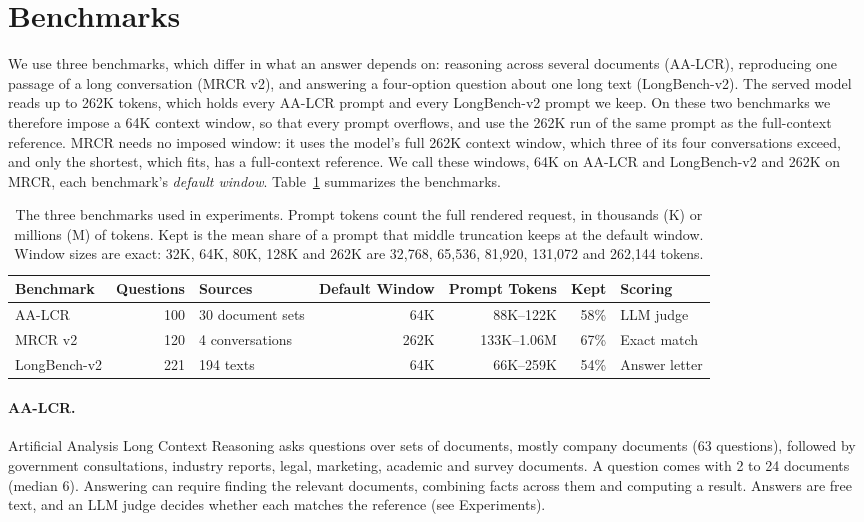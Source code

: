 \documentclass[letterpaper]{article} %
\begin{document}
\section{Benchmarks}
We use three benchmarks, which differ in what an answer depends on: reasoning across several documents (AA-LCR), reproducing one passage of a long conversation (MRCR v2), and answering a four-option question about one long text (LongBench-v2). The served model reads up to 262K tokens, which holds every AA-LCR prompt and every LongBench-v2 prompt we keep. On these two benchmarks we therefore impose a 64K context window, so that every prompt overflows, and use the 262K run of the same prompt as the full-context reference. MRCR needs no imposed window: it uses the model's full 262K context window, which three of its four conversations exceed, and only the shortest, which fits, has a full-context reference. We call these windows, 64K on AA-LCR and LongBench-v2 and 262K on MRCR, each benchmark's \emph{default window}. Table~\ref{tab:benchmarks} summarizes the benchmarks.

\begin{table}[t]
\centering
\small
\begin{tabular}{lrlrrrl}
\toprule
Benchmark & Questions & Sources & Default Window & Prompt Tokens & Kept & Scoring \\
\midrule
AA-LCR & 100 & 30 document sets & 64K & 88K--122K & 58\% & LLM judge \\
MRCR v2 & 120 & 4 conversations & 262K & 133K--1.06M & 67\% & Exact match \\
LongBench-v2 & 221 & 194 texts & 64K & 66K--259K & 54\% & Answer letter \\
\bottomrule
\end{tabular}
\caption{The three benchmarks used in experiments. Prompt tokens count the full rendered request, in thousands (K) or millions (M) of tokens. Kept is the mean share of a prompt that middle truncation keeps at the default window. Window sizes are exact: 32K, 64K, 80K, 128K and 262K are 32,768, 65,536, 81,920, 131,072 and 262,144 tokens.}
\label{tab:benchmarks}
\end{table}

\paragraph{AA-LCR.} Artificial Analysis Long Context Reasoning \cite{artificialanalysis2025aalcr} asks questions over sets of documents, mostly company documents (63 questions), followed by government consultations, industry reports, legal, marketing, academic and survey documents. A question comes with 2 to 24 documents (median 6). Answering can require finding the relevant documents, combining facts across them and computing a result. Answers are free text, and an LLM judge decides whether each matches the reference (see Experiments).
\end{document}
